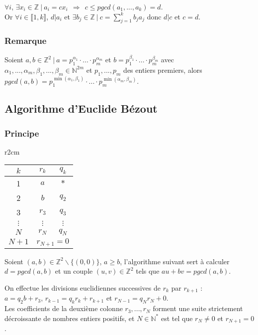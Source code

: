 \documentclass[a4paper,10pt]{book} %
\newcommand{\N}{\mathbb{N}}
\newcommand{\Z}{\mathbb{Z}}
\newcommand{\tq}{~|~}
\begin{document}
$\forall i$, $\exists x_i \in \Z\tq a_i=cx_i~~\Rightarrow ~~c\leq pgcd(a_1,...,a_k)=d$.\\
Or $\forall i\in \llbracket1,k\rrbracket$, $d|a_i$ et $\exists b_j\in \Z\tq\displaystyle c=\sum_{j=1}^k b_ja_j$ donc $d|c$ et $c=d$.

\subsubsection{Remarque}
Soient $a,b\in \Z^2\tq a=p_1^{\alpha_1}\cdot...\cdot p_m^{\alpha_m}$ et $b=p_1^{\beta_1}\cdot...\cdot p_m^{\beta_m}$ avec $\alpha_1,...,\alpha_m,\beta_1,...,\beta_m\in\N^{2m}$ et $p_1,...,p_m$ des entiers premiers, alors $pgcd(a,b)=p_1^{\min(\alpha_1,\beta_1)}\cdot...\cdot p_m^{\min(\alpha_m,\beta_m)}$.

\subsection{Algorithme d'Euclide Bézout}
\subsubsection{Principe}
\begin{wrapfigure}{r}{2cm}
\begin{tabular}{|c|cc|}
\hline $k$ & $r_k$ & $q_k$ \\
\hline 1 & $a$ & $*$ \\
\hline 2 & $b$ & $q_2$ \\
\hline 3 & $r_3$ & $q_3$ \\
\hline $\vdots$ & $\vdots$ & $\vdots$ \\
\hline $N$ & $r_N$ & $q_{N}$ \\
\hline $N+1$ & \multicolumn{2}{c|}{$r_{N+1}=0$} \\
\hline
\end{tabular}
\end{wrapfigure}

Soient $(a,b)\in\Z^2\backslash\{(0,0)\}$, $a\geq b$, l’algorithme suivant sert à calculer\\$d=pgcd(a,b)$ et un couple $(u,v)\in \Z^2$ tels que $au+bv=pgcd(a,b)$. \bigskip

On effectue les divisions euclidiennes successives de $r_k$ par $r_{k+1}$ :\\$a=q_2b+r_3$, $r_{k-1}=q_kr_k+r_{k+1}$ et $r_{N-1}=q_Nr_N+0$.\\

Les coefficients de la deuxième colonne $r_3,...,r_N$ forment une suite strictement décroissante de nombres entiers positifs, et $N\in\N^*$ est tel que $r_N\neq 0$ et $r_{N+1}=0$.\bigskip
\end{document}
